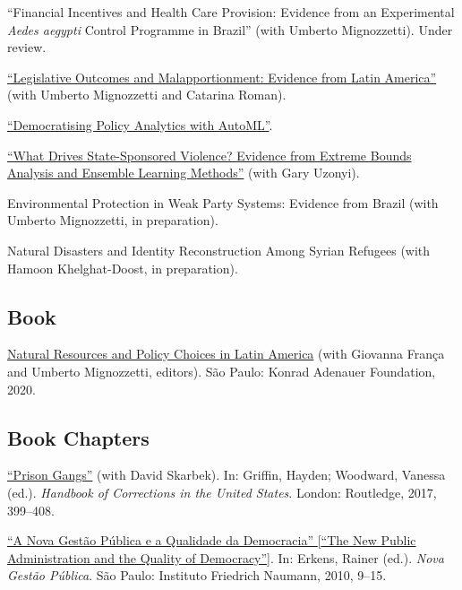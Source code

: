 \documentclass[a4paper]{article}
\renewenvironment{itemize}{
	\begin{list}{}{
			\setlength{\leftmargin}{1.5em}
		}
		}{
	\end{list}
}
\begin{document}
\begin{itemize}
\item ``Financial Incentives and Health Care Provision: Evidence from an Experimental \textit{Aedes aegypti} Control Programme in Brazil'' (with Umberto Mignozzetti). Under review.
\item \href{https://danilofreire.github.io/texts/malapportionment.pdf}{``Legislative Outcomes and Malapportionment: Evidence from Latin America''} (with Umberto Mignozzetti and Catarina Roman).
\item \href{https://github.com/danilofreire/mercatus-analytics-papers/blob/main/automl-paper/automl.pdf}{``Democratising Policy Analytics with AutoML''}.
\item \href{https://osf.io/pzx3q}{``What Drives State-Sponsored Violence? Evidence from Extreme Bounds Analysis and Ensemble Learning Methods''} (with Gary Uzonyi).
\item Environmental Protection in Weak Party Systems: Evidence from Brazil (with Umberto Mignozzetti, in preparation).
\item Natural Disasters and Identity Reconstruction Among Syrian Refugees (with Hamoon Khelghat-Doost, in preparation).
\end{itemize}

\subsection*{Book}

\begin{itemize}
\item \href{https://github.com/danilofreire/danilofreire.github.io/blob/01dc4c9566bb5ade15b5db950046ed0a386fc5f1/texts/natural_resources_policy_choices_latam.pdf}{Natural Resources and Policy Choices in Latin America} (with Giovanna França and Umberto Mignozzetti, editors). São Paulo: Konrad Adenauer Foundation, 2020.
\end{itemize}

\subsection*{Book Chapters}

\begin{itemize}
\item \href{https://osf.io/kuqqx/}{``Prison Gangs''} (with David Skarbek). In: Griffin, Hayden; Woodward, Vanessa (ed.). \textit{Handbook of Corrections in the United States}. London: Routledge, 2017, 399--408.
\item \href{https://fnst.org/sites/default/files/uploads/2017/12/08/ngp.pdf}{``A Nova Gest\~{a}o P\'{u}blica e a Qualidade da Democracia'' {[}``The New Public Administration and the Quality of Democracy''{]}}. In: Erkens, Rainer (ed.). \textit{Nova Gest\~{a}o P\'{u}blica}. S\~{a}o Paulo: Instituto Friedrich Naumann, 2010, 9--15.
\end{itemize}
\end{document}
